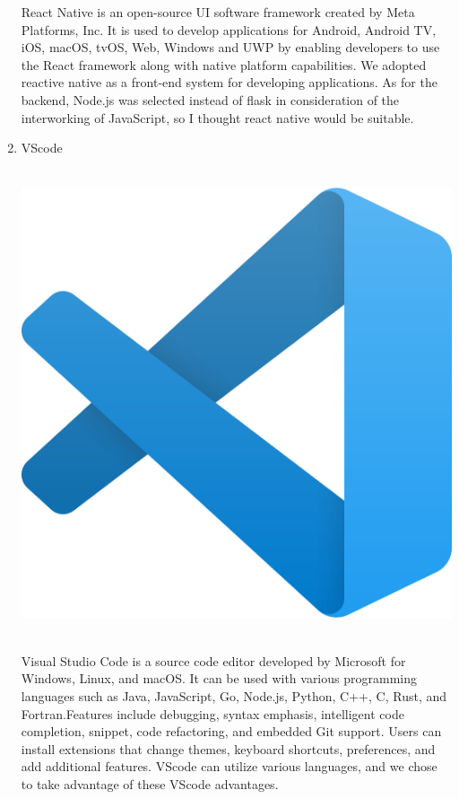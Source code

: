 \documentclass[conference]{IEEEtran}
\begin{document}
\begin{enumerate}
React Native is an open-source UI software framework created by Meta Platforms, Inc. It is used to develop applications for Android, Android TV, iOS, macOS, tvOS, Web, Windows and UWP by enabling developers to use the React framework along with native platform capabilities. We adopted reactive native as a front-end system for developing applications. As for the backend, Node.js was selected instead of flask in consideration of the interworking of JavaScript, so I thought react native would be suitable.\\
	\item{VScode}\\
	\\
	\centerline{\includegraphics[scale=0.05]{pics/VScode.png}}\\
Visual Studio Code is a source code editor developed by Microsoft for Windows, Linux, and macOS. It can be used with various programming languages such as Java, JavaScript, Go, Node.js, Python, C++, C, Rust, and Fortran.Features include debugging, syntax emphasis, intelligent code completion, snippet, code refactoring, and embedded Git support. Users can install extensions that change themes, keyboard shortcuts, preferences, and add additional features. VScode can utilize various languages, and we chose to take advantage of these VScode advantages.\\

\end{enumerate}
\end{document}
